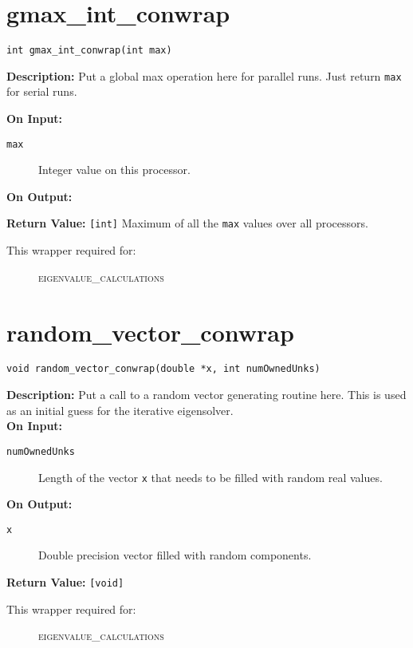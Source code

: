\section{gmax\_int\_conwrap}

\texttt{int gmax\_int\_conwrap(int max)}

{\bf Description:} Put a global max operation here for parallel runs. Just
return \texttt{max} for serial runs.\

{\bf On Input:}
\begin{description}
\item[\texttt{max}] Integer value on this processor.
\end{description}

{\bf On Output:}

{\bf Return Value:} \texttt{[int]} Maximum of all the \texttt{max} values over all processors.

\begin{description}
\item[This wrapper required for:]
\textsc{eigenvalue\_calculations}
\end{description}

\section{random\_vector\_conwrap}

\texttt{void random\_vector\_conwrap(double *x, int numOwnedUnks)}

{\bf Description:}  Put a call to a random vector generating routine
here. This is used as an initial guess for the iterative eigensolver.\\

{\bf On Input:}
\begin{description}
\item[\texttt{numOwnedUnks}] Length of the vector \texttt{x} that needs to be filled with random real values.
\end{description}

{\bf On Output:}
\begin{description}
\item[\texttt{x}] Double precision vector filled with random components.
\end{description}

{\bf Return Value:} \texttt{[void]} 

\begin{description}
\item[This wrapper required for:]
\textsc{eigenvalue\_calculations}
\end{description}


